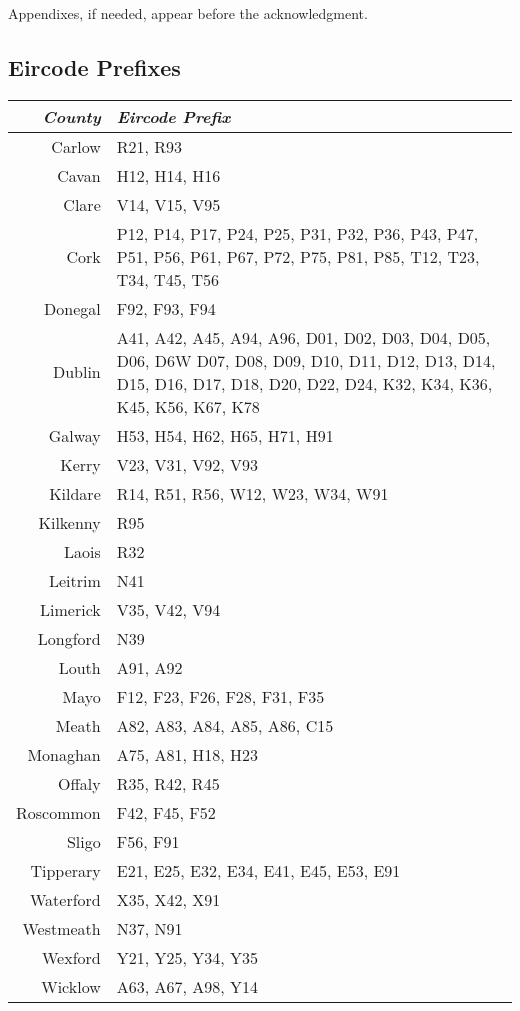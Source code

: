 \documentclass[twocolumn]{article}
\begin{document}
Appendixes, if needed, appear before the acknowledgment.



\raggedright

\begin{appendices}
\section{Eircode Prefixes}\label{a:eircode}
\begin{tabularx}{0.5\textwidth}{r X}
    \textit{County} & \textit{Eircode Prefix} \\ \hline
    Carlow & R21, R93 \\ \hline
    Cavan & H12, H14, H16 \\ \hline
    Clare & V14, V15, V95 \\ \hline
    Cork & P12, P14, P17, P24, P25, P31, P32, P36, P43, P47, P51, P56, P61, P67, P72, P75, P81, P85, T12, T23, T34, T45, T56 \\ \hline
    Donegal & F92, F93, F94 \\ \hline
    Dublin & A41, A42, A45, A94, A96, D01, D02, D03, D04, D05, D06, D6W D07, D08, D09, D10, D11, D12, D13, D14, D15, D16, D17, D18, D20, D22, D24, K32, K34, K36, K45, K56, K67, K78 \\ \hline
    Galway & H53, H54, H62, H65, H71, H91 \\ \hline
    Kerry & V23, V31, V92, V93 \\ \hline
    Kildare & R14, R51, R56, W12, W23, W34, W91 \\ \hline
    Kilkenny & R95 \\ \hline
    Laois & R32 \\ \hline
    Leitrim & N41 \\ \hline
    Limerick & V35, V42, V94 \\ \hline
    Longford & N39 \\ \hline
    Louth & A91, A92 \\ \hline
    Mayo & F12, F23, F26, F28, F31, F35 \\ \hline
    Meath & A82, A83, A84, A85, A86, C15 \\ \hline
    Monaghan & A75, A81, H18, H23 \\ \hline
    Offaly & R35, R42, R45 \\ \hline
    Roscommon & F42, F45, F52 \\ \hline
    Sligo & F56, F91 \\ \hline
    Tipperary & E21, E25, E32, E34, E41, E45, E53, E91 \\ \hline
    Waterford & X35, X42, X91 \\ \hline
    Westmeath & N37, N91 \\ \hline
    Wexford & Y21, Y25, Y34, Y35 \\ \hline
    Wicklow & A63, A67, A98, Y14
\end{tabularx}

\end{appendices}
\end{document}
